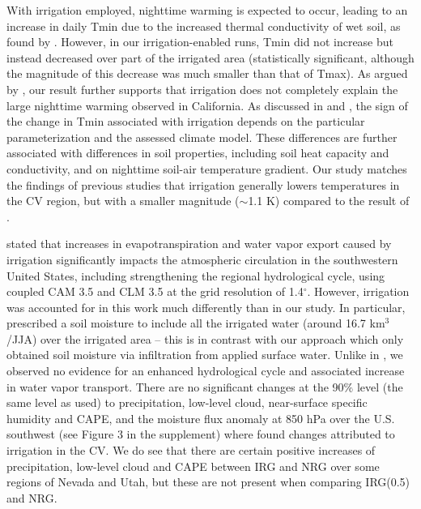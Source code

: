 \documentclass[draft,ms]{agutex}   %
\begin{document}
\begin{article}
With irrigation employed, nighttime warming is expected to occur, leading to an increase in daily Tmin due to the increased thermal conductivity of wet soil, as found by \cite{kanamaru2008model}. However, in our irrigation-enabled runs, Tmin did not increase but instead decreased over part of the irrigated area (statistically significant, although the magnitude of this decrease was much smaller than that of Tmax). As argued by \cite{bonfils2007empirical}, our result further supports that irrigation does not completely explain the large nighttime warming observed in California. As discussed in \cite{kueppers2008seasonal} and \cite{kanamaru2008model}, the sign of the change in Tmin associated with irrigation depends on the particular parameterization and the assessed climate model.  These differences are further associated with differences in soil properties, including soil heat capacity and conductivity, and on nighttime soil-air temperature gradient. Our study matches the findings of previous studies that irrigation generally lowers temperatures in the CV region, but with a smaller magnitude ($\sim$1.1 K) compared to the result of \citet{lobell2006biogeophysical}. 


\cite{lo2013irrigation} stated that increases in evapotranspiration and water vapor export caused by irrigation significantly impacts the atmospheric circulation in the southwestern United States, including strengthening the regional hydrological cycle, using coupled CAM 3.5 and CLM 3.5 at the grid resolution of 1.4$^\circ$. However, irrigation was accounted for in this work much differently than in our study.  In particular, \cite{lo2013irrigation} prescribed a soil moisture to include all the irrigated water (around 16.7 km$^3$/JJA) over the irrigated area -- this is in contrast with our approach which only obtained soil moisture via infiltration from applied surface water.  Unlike in \cite{lo2013irrigation}, we observed no evidence for an enhanced hydrological cycle and associated increase in water vapor transport. There are no significant changes at the 90$\%$ level (the same level as \cite{lo2013irrigation} used) to precipitation, low-level cloud, near-surface specific humidity and CAPE, and the moisture flux anomaly at 850 hPa over the U.S. southwest (see Figure 3 in the supplement) where \cite{lo2013irrigation} found changes attributed to irrigation in the CV. We do see that there are certain positive increases of precipitation, low-level cloud and CAPE between IRG and NRG over some regions of Nevada and Utah, but these are not present when comparing IRG(0.5) and NRG.



\end{article}
\end{document}
